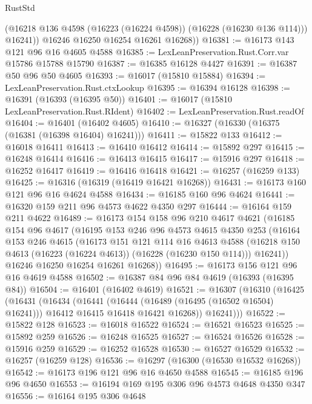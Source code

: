 \begin{lexlean}{RustStd}
\begin{coremodule}
            (@16218 @136 @4598 (@16223 (@16224 @4598)) (@16228 (@16230 @136 @114)))
            @16241))
        @16246
        @16250
        @16254
        @16261
        @16268))
@16381 := @16173 @143 @121 @96 @16 @4605 @4588
@16385 := LexLeanPreservation.Rust.Corr.var @15786 @15788 @15790
@16387 := @16385 @16128 @4427
@16391 := @16387 @50 @96 @50 @4605
@16393 := @16017 (@15810 @15884)
@16394 := LexLeanPreservation.Rust.ctxLookup
@16395 := @16394 @16128
@16398 := @16391 (@16393 (@16395 @50))
@16401 := @16017 (@15810 LexLeanPreservation.Rust.RIdent)
@16402 := LexLeanPreservation.Rust.readOf
@16404 := @16401 (@16402 @4605)
@16410 := @16327 (@16330 (@16375 (@16381 (@16398 @16404) @16241)))
@16411 := @15822 @133
@16412 := @16018 @16411
@16413 := @16410 @16412
@16414 := @15892 @297
@16415 := @16248 @16414
@16416 := @16413 @16415
@16417 := @15916 @297
@16418 := @16252 @16417
@16419 := @16416 @16418
@16421 := @16257 (@16259 @133)
@16425 := @16316 (@16319 (@16419 @16421 @16268))
@16431 := @16173 @160 @121 @96 @16 @4624 @4588
@16434 := @16185 @160 @96 @4624
@16441 := @16320 @159 @211 @96 @4573 @4622 @4350 @297
@16444 := @16164 @159 @211 @4622
@16489 := @16173
    @154
    @158
    @96
    @210
    @4617
    @4621
    (@16185
      @154
      @96
      @4617
      (@16195
        @153
        @246
        @96
        @4573
        @4615
        @4350
        @253
        (@16164
          @153
          @246
          @4615
          (@16173
            @151
            @121
            @114
            @16
            @4613
            @4588
            (@16218 @150 @4613 (@16223 (@16224 @4613)) (@16228 (@16230 @150 @114)))
            @16241))
        @16246
        @16250
        @16254
        @16261
        @16268))
@16495 := @16173 @156 @121 @96 @16 @4619 @4588
@16502 := @16387 @84 @96 @84 @4619 (@16393 (@16395 @84))
@16504 := @16401 (@16402 @4619)
@16521 := @16307
    (@16310
      (@16425
        (@16431
          (@16434
            (@16441
              (@16444 (@16489 (@16495 (@16502 @16504) @16241)))
              @16412
              @16415
              @16418
              @16421
              @16268))
          @16241)))
@16522 := @15822 @128
@16523 := @16018 @16522
@16524 := @16521 @16523
@16525 := @15892 @259
@16526 := @16248 @16525
@16527 := @16524 @16526
@16528 := @15916 @259
@16529 := @16252 @16528
@16530 := @16527 @16529
@16532 := @16257 (@16259 @128)
@16536 := @16297 (@16300 (@16530 @16532 @16268))
@16542 := @16173 @196 @121 @96 @16 @4650 @4588
@16545 := @16185 @196 @96 @4650
@16553 := @16194 @169 @195 @306 @96 @4573 @4648 @4350 @347
@16556 := @16164 @195 @306 @4648

\end{coremodule}
\end{lexlean}
